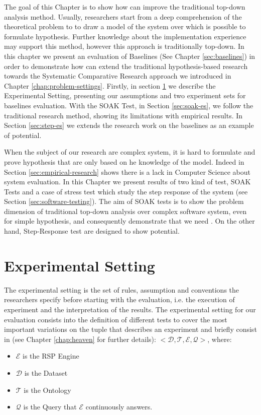 The goal of this Chapter is to show how \name can improve the traditional top-down analysis method. Usually, researchers start from a deep comprehension of the theoretical problem  to to draw a model of the system over which is possible to formulate hypothesis. Further knowledge about  the implementation experience may support this method, however this approach is traditionally top-down. In this chapter we present an evaluation of \name Baselines (See Chapter \ref{sec:baselines}) in order to demonstrate how \name can extend the traditional hypothesis-based research towards the Systematic Comparative Research approach we introduced in Chapter \ref{chap:problem-settings}. Firstly, in section \ref{sec:experimental-setting} we describe the Experimental Setting, presenting our assumptions and two experiment sets for baselines evaluation. With the SOAK Test, in Section \ref{sec:soak-es}, we follow the traditional research method, showing its limitations with empirical results. In Section \ref{sec:step-es} we extends the research work on the baselines as an example of \name potential.

When the subject of our research are complex system, it is hard to formulate and prove hypothesis that are only based on he knowledge of the model. Indeed in Section \ref{sec:empirical-research} shows there is a lack in Computer Science about system evaluation. In this Chapter we present results of two kind of test, SOAK Tests and a case of stress test which study the step response of the system (see Section \ref{sec:software-testing}). The aim of SOAK tests is to show the problem dimension of traditional top-down analysis over complex software system, even for simple hypothesis, and consequently demonstrate that we need \namens . On the other hand, Step-Response test are designed to show \name potential.


\section{Experimental Setting}
\label{sec:experimental-setting}
The experimental setting is the set of rules, assumption and conventions the researchers specify before starting with the evaluation, i.e. the execution of experiment and the interpretation of the results. The experimental setting for our evaluation consists into the definition of different tests to cover the most important variations on the tuple that describes an experiment and briefly consist in (see Chapter \ref{chap:heaven} for further details): $<\mathcal{D}, \mathcal{T},\mathcal{E}, \mathcal{Q}>$, where:
\begin{itemize}
\item $\mathcal{E}$ is the RSP Engine
\item $\mathcal{D}$ is the Dataset 
\item $\mathcal{T}$ is the Ontology
\item $\mathcal{Q}$ is the Query that $\mathcal{E}$ continuously answers.
\end{itemize}


